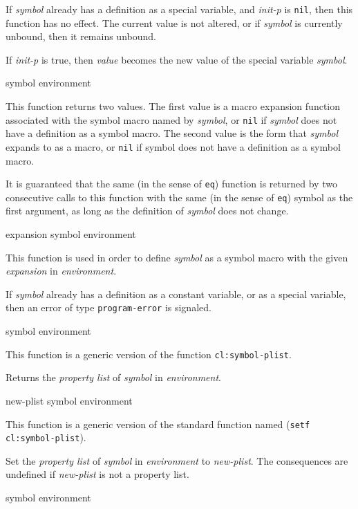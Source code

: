 If \textit{symbol} already has a definition as a special variable, and
\textit{init-p} is \texttt{nil}, then this function has no effect.
The current value is not altered, or if \textit{symbol} is currently
unbound, then it remains unbound.

If \textit{init-p} is true, then \textit{value} becomes the new value
of the special variable \textit{symbol}.

 {symbol environment}

This function returns two values.  The first value is a macro
expansion function associated with the symbol macro named by
\textit{symbol}, or \texttt{nil} if \textit{symbol} does not have a
definition as a symbol macro.  The second value is the form that
\textit{symbol} expands to as a macro, or \texttt{nil} if symbol does
not have a definition as a symbol macro.

It is guaranteed that the same (in the sense of \texttt{eq}) function
is returned by two consecutive calls to this function with the same
(in the sense of \texttt{eq})
symbol as the first argument, as long as the definition of
\textit{symbol} does not change.

 {expansion symbol environment}

This function is used in order to define \textit{symbol} as a symbol
macro with the given \textit{expansion} in \textit{environment}.

If \textit{symbol} already has a definition as a constant variable, or
as a special variable, then an error of type \texttt{program-error} is
signaled.

 {symbol environment}

This function is a generic version of the \commonlisp{} function
\texttt{cl:symbol-plist}.

Returns the \emph{property list} of \textit{symbol} in
\textit{environment}.

 {new-plist symbol environment}

This function is a generic version of the standard \commonlisp{}
function named (\texttt{setf cl:symbol-plist}).

Set the \emph{property list} of \textit{symbol} in
\textit{environment} to \textit{new-plist}.  The consequences are
undefined if \textit{new-plist} is not a property list.

 {symbol environment}

